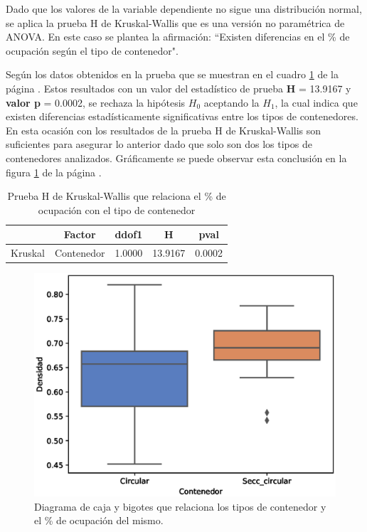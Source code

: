 \documentclass{article}
\begin{document}
Dado que los valores de la variable dependiente no sigue una distribución normal, se aplica la prueba H de Kruskal-Wallis que es una versión no paramétrica de ANOVA. En este caso se plantea la afirmación: ``Existen diferencias en el \% de ocupación según el tipo de contenedor".

Según los datos obtenidos en la prueba que se muestran en el cuadro \ref{tab:5} de la página \pageref{tab:5}. Estos resultados con un valor del estadístico de prueba \textbf{H} = 13.9167 y \textbf{valor p} = 0.0002, se rechaza la hipótesis $H_{0}$ aceptando la $H_{1}$, la cual indica que existen diferencias estadísticamente significativas entre los tipos de contenedores. En esta ocasión con los resultados de la prueba H de Kruskal-Wallis son suficientes para asegurar lo anterior dado que solo son dos los tipos de contenedores analizados. Gráficamente se puede observar esta conclusión en la figura \ref{fig:3} de la página \pageref{fig:3}.

\begin{table}
  \centering
  \caption{Prueba H de Kruskal-Wallis que relaciona el \% de ocupación con el tipo de contenedor }
    \begin{tabular}{ccccc}
    \toprule
          & \textbf{Factor} & \textbf{ddof1} & \textbf{H} & \textbf{pval} \\
    \midrule
    Kruskal & Contenedor & 1.0000 & 13.9167 & 0.0002 \\
    \bottomrule
    \end{tabular}%
  \label{tab:5}%
\end{table}%

\begin{figure}
    \centering
    \includegraphics[scale=0.7]{figuras/boxplot_Contenedor.eps}
    \caption{Diagrama de caja y bigotes que relaciona los tipos de contenedor y el \% de ocupación del mismo.}
    \label{fig:3}
\end{figure}
\end{document}

